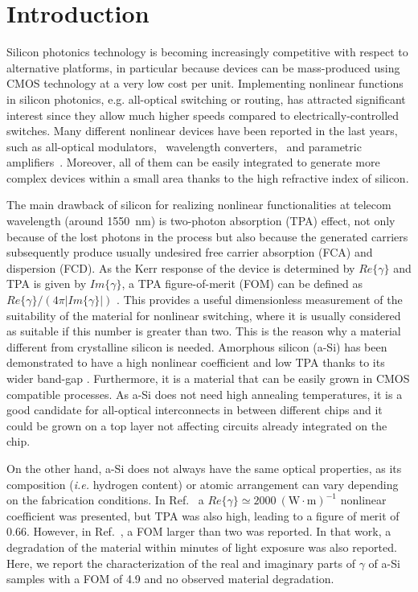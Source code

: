\documentclass[10pt,letterpaper]{article}
\begin{document}
\section{Introduction}
Silicon photonics technology is becoming increasingly competitive with respect to alternative platforms, in particular because devices can be mass-produced using CMOS technology at a very low cost per unit. Implementing nonlinear functions in silicon photonics, e.g. all-optical switching or routing, has attracted significant interest since they allow much higher speeds compared to electrically-controlled switches. Many different nonlinear devices have been reported in the last years, such as all-optical modulators,~\cite{Almeida2004b} wavelength converters,~\cite{Lee2009} and parametric amplifiers~\cite{Kuyken2011a}. Moreover, all of them can be easily integrated to generate more complex devices within a small area thanks to the high refractive index of silicon.


The main drawback of silicon for realizing nonlinear functionalities at telecom wavelength (around 1550~nm) is two-photon absorption (TPA) effect, not only because of the lost photons in the process but also because the generated carriers subsequently produce usually undesired free carrier absorption (FCA) and dispersion (FCD). As the Kerr response of the device is determined by $Re\{\gamma\}$ and TPA is given by $Im\{\gamma\}$, a TPA figure-of-merit (FOM) can be defined as $Re\{\gamma\}/(4\pi |Im\{\gamma\}|)$  \cite{Mizrahi1989}. This provides a useful dimensionless measurement of the suitability of the material for nonlinear switching, where it is usually considered as suitable if this number is greater than two. This is the reason why a material different from crystalline silicon is needed.  Amorphous silicon (a-Si) has been demonstrated to have a high nonlinear coefficient \cite{Narayanan2010} and low TPA thanks to its wider band-gap \cite{OLeary1997}. Furthermore, it is a material that can be easily grown in CMOS compatible processes. As a-Si does not need high annealing temperatures, it is a good candidate for all-optical interconnects in between different chips and it could be grown on a top layer not affecting circuits already integrated on the chip.



On the other hand, a-Si does not always have the same optical properties, as its composition (\emph{i.e.} hydrogen content) or atomic arrangement can vary depending on the fabrication conditions. In Ref.~\cite{Narayanan2010} a $Re\{\gamma\} \simeq 2000~(\mathrm{W}\cdot\mathrm{m})^{-1}$ nonlinear coefficient was presented, but TPA was also high, leading to a figure of merit of 0.66. However, in Ref.~\cite{Kuyken2011}, a FOM larger than two was reported. In that work, a degradation of the material within minutes of light exposure was also reported. Here, we report the characterization of the real and imaginary parts of $\gamma$ of a-Si samples with a FOM of 4.9 and no observed material degradation.
\end{document}
